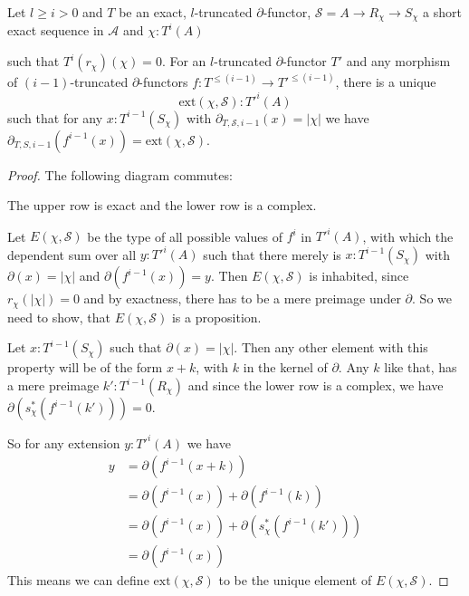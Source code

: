 \begin{lemma}
  \label{lem:extend-map}
  Let $l\geq i>0$ and $T$ be an exact, $l$-truncated $\partial$-functor, $\mathcal{S}=A\to R_\chi\to S_\chi$ a short exact sequence in $\mathcal A$
  and $\chi:T^i(A)$
  \begin{center}
  \end{center}
  such that $T^i(r_\chi)(\chi)=0$.
  For an $l$-truncated $\partial$-functor $T'$
  and any morphism of $(i-1)$-truncated $\partial$-functors $f:T^{\leq (i-1)}\to T'^{\leq (i-1)}$, there is a unique
  \[\mathrm{ext}(\chi,\mathcal{S}) : T'^i(A)\]
  such that for any $x:T^{i-1}(S_\chi)$ with $\partial_{T,\mathcal{S},i-1}(x)=|\chi|$ we have $\partial_{T,S,i-1}(f^{i-1}(x))=\mathrm{ext}(\chi,\mathcal{S})$.
\end{lemma}

\begin{proof}
  The following diagram commutes:
  \begin{center}
  \end{center}
  The upper row is exact and the lower row is a complex.

  Let $E(\chi,\mathcal{S})$ be the type of all possible values of $f^i$ in $T'^i(A)$,
  with which the dependent sum over all $y:T'^i(A)$ such that there merely is $x:T^{i-1}(S_\chi)$ with $\partial(x)=|\chi|$
  and $\partial(f^{i-1}(x))=y$.
  Then $E(\chi,\mathcal{S})$ is inhabited, since $r_\chi(|\chi|)=0$ and by exactness, there has to be a mere preimage under $\partial$.
  So we need to show, that $E(\chi,\mathcal{S})$ is a proposition.
  
  Let $x:T^{i-1}(S_\chi)$ such that $\partial(x)=|\chi|$.
  Then any other element with this property will be of the form $x+k$, with $k$ in the kernel of $\partial$.
  Any $k$ like that, has a mere preimage $k':T^{i-1}(R_\chi)$ and since the lower row is a complex, we have $\partial(s_\chi^\ast(f^{i-1}(k')))=0$.
  
  So for any extension $y:T'^{i}(A)$ we have
  \begin{align*}
    y &= \partial(f^{i-1}(x+k)) \\
      &= \partial(f^{i-1}(x))+\partial(f^{i-1}(k)) \\
      &= \partial(f^{i-1}(x))+\partial(s_\chi^\ast(f^{i-1}(k'))) \\
      &= \partial(f^{i-1}(x))
  \end{align*}
  This means we can define $\mathrm{ext}(\chi,\mathcal{S})$ to be the unique element of $E(\chi,\mathcal{S})$.
\end{proof}

